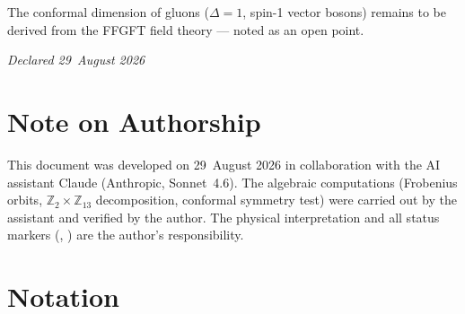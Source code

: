 The conformal dimension of gluons ($\Delta=1$, spin-1 vector bosons) remains
to be derived from the FFGFT field theory — noted as an open point.

\emph{Declared 29~August 2026}

\section{Note on Authorship}

This document was developed on 29~August 2026 in collaboration with the
AI assistant Claude (Anthropic, Sonnet~4.6). The algebraic computations
(Frobenius orbits, $\mathbb{Z}_2\times\mathbb{Z}_{13}$ decomposition,
conformal symmetry test) were carried out by the assistant and verified by
the author. The physical interpretation and all status markers
(\BM, \KM) are the author's responsibility.

\section{Notation}


